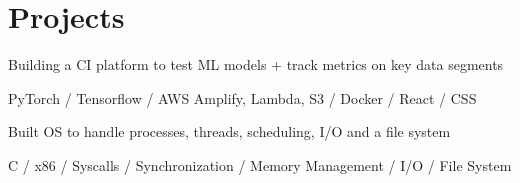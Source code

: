 \documentclass[]{deedy-resume-openfont}
\begin{document}
\begin{minipage}[t]{0.66\textwidth}
\section{Projects}
\location{}
\begin{tightemize}
\item Building a CI platform to test ML models + track metrics on key data segments
\item PyTorch / Tensorflow / AWS Amplify, Lambda, S3 / Docker / React / CSS
\end{tightemize}
\sectionsep

\location{}
\begin{tightemize}
\item Built OS to handle processes, threads, scheduling, I/O and a file system
\item C / x86 / Syscalls / Synchronization / Memory Management / I/O / File System
\end{tightemize}
\sectionsep


\end{minipage} 
\end{document}

